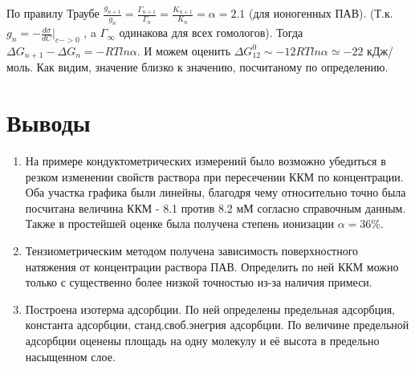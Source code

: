 \documentclass[a4paper, 12pt]{article}
\begin{document}
По правилу Траубе $\frac{g_{n+1}}{g_n} = \frac{\Gamma_{n+1}}{\Gamma_n} = \frac{K_{n+1}}{K_n} = \alpha = 2.1$ (для ионогенных ПАВ). (Т.к. $g_n = -\frac{d\sigma}{dC} \bigg| _{c->0}$ , a $\Gamma_{\infty}$ одинакова для всех гомологов). Тогда $\Delta G_{n+1} - \Delta G_n = -RTln \alpha$. И можем оценить $\Delta G^0_{12} \sim -12 RT ln \alpha \simeq -22$ кДж/моль. Как видим, значение близко к значению, посчитаному по определению.


 \section{Выводы}
\begin{enumerate}
    \item На примере кондуктометрических измерений было возможно убедиться в резком изменении свойств раствора при пересечении ККМ по концентрации. Оба участка графика были линейны, благодря чему относительно точно была посчитана величина ККМ - 8.1 против 8.2 мМ согласно справочным данным. Также в простейшей оценке была получена степень ионизации $\alpha = 36$\%.
    
    \item Тензиометрическим методом получена зависимость поверхностного натяжения от концентрации раствора ПАВ. Определить по ней ККМ можно только с существенно более низкой точностью из-за наличия примеси. 
    
    \item Построена изотерма адсорбции. По ней определены предельная адсорбция, константа адсорбции, станд.своб.энегрия адсорбции. По величине предельной адсорбции оценены площадь на одну молекулу и её высота в предельно насыщенном слое. 

\end{enumerate}
\end{document}
